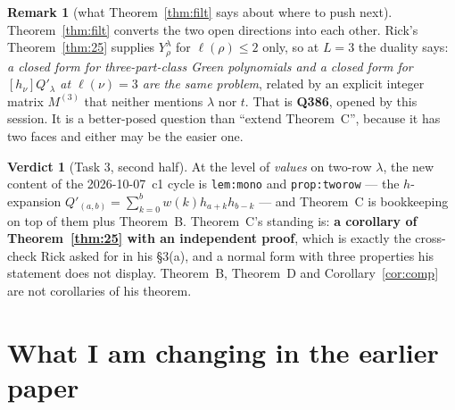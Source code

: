 \documentclass[11pt]{article}
\theoremstyle{definition}
\newtheorem{remark}[theorem]{Remark}
\newtheorem{verdict}[theorem]{Verdict}
\newcommand{\lam}{\lambda}
\newcommand{\Qp}{Q'}
\begin{document}
\begin{remark}[what Theorem~\ref{thm:filt} says about where to push next]
Theorem~\ref{thm:filt} converts the two open directions into each other. Rick's
Theorem~\ref{thm:25} supplies $Y^\lam_\rho$ for $\ell(\rho)\le2$ only, so at $L=3$ the duality
says: \emph{a closed form for three-part-class Green polynomials and a closed form for
$[h_\nu]\Qp_\lam$ at $\ell(\nu)=3$ are the same problem}, related by an explicit integer matrix
$M^{(3)}$ that neither mentions $\lam$ nor $t$. That is \textbf{Q386}, opened by this session. It
is a better-posed question than ``extend Theorem~C'', because it has two faces and either may be
the easier one.
\end{remark}

\begin{verdict}[Task 3, second half]
At the level of \emph{values} on two-row $\lam$, the new content of the 2026-10-07~c1 cycle is
\texttt{lem:mono} and \texttt{prop:tworow} --- the $h$-expansion
$\Qp_{(a,b)}=\sum_{k=0}^{b}w(k)h_{a+k}h_{b-k}$ --- and Theorem~C is bookkeeping on top of them
plus Theorem~B. Theorem~C's standing is: \textbf{a corollary of Theorem~\ref{thm:25} with an
independent proof}, which is exactly the cross-check Rick asked for in his \S3(a), and a normal
form with three properties his statement does not display. Theorem~B, Theorem~D and
Corollary~\ref{cor:comp} are not corollaries of his theorem.
\end{verdict}

\section{What I am changing in the earlier paper}
\end{document}
